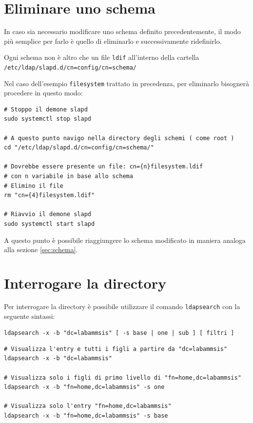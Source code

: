 \documentclass[a4paper]{report}
\newenvironment{code}{\begin{tcolorbox}[size=small]}{\end{tcolorbox}}
\begin{document}
\section{Eliminare uno schema}

In caso sia necessario modificare uno schema definito precedentemente, il modo più semplice per farlo è quello di eliminarlo e successivamente ridefinirlo.

Ogni schema non è altro che un file \texttt{ldif} all'interno della cartella \texttt{/etc/ldap/slapd.d/cn=config/cn=schema/}

Nel caso dell'esempio \texttt{filesystem} trattato in precedenza, per eliminarlo bisognerà procedere in questo modo:

\begin{code}
\begin{lstlisting}
# Stoppo il demone slapd
sudo systemctl stop slapd

# A questo punto navigo nella directory degli schemi ( come root )
cd "/etc/ldap/slapd.d/cn=config/cn=schema/"

# Dovrebbe essere presente un file: cn={n}filesystem.ldif
# con n variabile in base allo schema
# Elimino il file
rm "cn={4}filesystem.ldif"

# Riavvio il demone slapd
sudo systemctl start slapd
\end{lstlisting}
\end{code}

A questo punto è possibile riaggiungere lo schema modificato in maniera analoga alla sezione \ref{sec:schema}.

\section{Interrogare la directory}

Per interrogare la directory è possibile utilizzare il comando \texttt{ldapsearch} con la seguente sintassi:

\begin{center}
	\texttt{ldapsearch -x -b "dc=labammsis" [ -s base | one | sub ] [ filtri ]}
\end{center}

\begin{code}
\begin{lstlisting}
# Visualizza l'entry e tutti i figli a partire da "dc=labammsis"
ldapsearch -x -b "dc=labammsis"

# Visualizza solo i figli di primo livello di "fn=home,dc=labammsis"
ldapsearch -x -b "fn=home,dc=labammsis" -s one

# Visualizza solo l'entry "fn=home,dc=labammsis"
ldapsearch -x -b "fn=home,dc=labammsis" -s base
\end{lstlisting}
\end{code}
\end{document}
